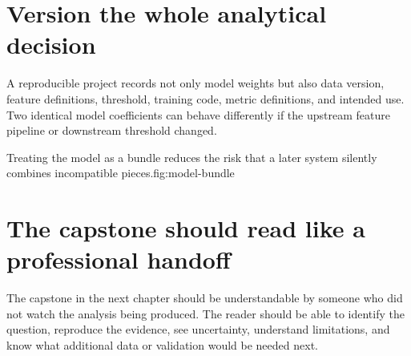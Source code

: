 \section{Version the whole analytical decision}
A reproducible project records not only model weights but also data version, feature definitions, threshold, training code, metric definitions, and intended use. Two identical model coefficients can behave differently if the upstream feature pipeline or downstream threshold changed.

\begin{utpfig}{Treating the model as a bundle reduces the risk that a later system silently combines incompatible pieces.}{fig:model-bundle}
\end{utpfig}

\section{The capstone should read like a professional handoff}
The capstone in the next chapter should be understandable by someone who did not watch the analysis being produced. The reader should be able to identify the question, reproduce the evidence, see uncertainty, understand limitations, and know what additional data or validation would be needed next.

